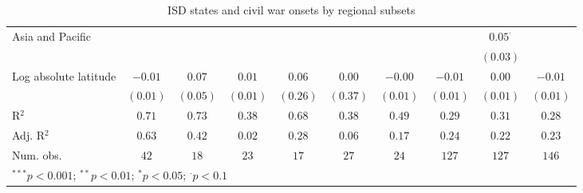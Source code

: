 \begin{sidewaystable}
\begin{center}
{\begin{tabular}{l c c c c c c c c c}
Asia and Pacific                  &                &                &          &          &          &          &                & $0.05^{\cdot}$ &              \\
                                  &                &                &          &          &          &          &                & $(0.03)$       &              \\
Log absolute latitude             & $-0.01$        & $0.07$         & $0.01$   & $0.06$   & $0.00$   & $-0.00$  & $-0.01$        & $0.00$         & $-0.01$      \\
                                  & $(0.01)$       & $(0.05)$       & $(0.01)$ & $(0.26)$ & $(0.37)$ & $(0.01)$ & $(0.01)$       & $(0.01)$       & $(0.01)$     \\
\hline
R$^2$                             & $0.71$         & $0.73$         & $0.38$   & $0.68$   & $0.38$   & $0.49$   & $0.29$         & $0.31$         & $0.28$       \\
Adj. R$^2$                        & $0.63$         & $0.42$         & $0.02$   & $0.28$   & $0.06$   & $0.17$   & $0.24$         & $0.22$         & $0.23$       \\
Num. obs.                         & $42$           & $18$           & $23$     & $17$     & $27$     & $24$     & $127$          & $127$          & $146$        \\
\hline
\multicolumn{10}{l}{\scriptsize{$^{***}p<0.001$; $^{**}p<0.01$; $^{*}p<0.05$; $^{\cdot}p<0.1$}}
\end{tabular}
}
\caption{ISD states and civil war onsets by regional subsets}
\label{table:coefficients}
\end{center}
\end{sidewaystable}
